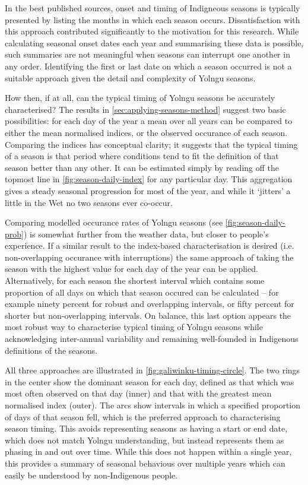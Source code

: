 In the best published sources, onset and timing of Indigneous seasons is typically presented
by listing the months in which each season occurs.  Dissatisfaction with this
approach contributed significantly to the motivation for this research.
%
While calculating seasonal onset dates each year and summarising these data
is possible, such summaries are not meaningful when seasons can interrupt
one another in any order.  Identifying the first or last date on which a
season occurred is not a suitable approach given the detail and complexity of Yolngu seasons.

How then, if at all, can the typical timing of Yolngu seasons be accurately
characterised?  The results in \cref{sec:applying-seasons-method} suggest two
basic possibilities: for each day of the year a mean over all years can be
compared to either the mean normalised indices, or the observed occurance
of each season.
%
Comparing the indices has conceptual clarity; it suggests that the
typical timing of a season is that period where conditions tend to fit the
definition of that season better than any other.  It can be estimated simply
by reading off the topmost line in \cref{fig:season-daily-index} for any
particular day.  This aggregation gives a steady seasonal progression for most of the
year, and while it `jitters' a little in the Wet no two seasons ever co-occur.

Comparing modelled occurance rates of Yolngu seasons (see \cref{fig:season-daily-prob}) is somewhat
further from the weather data, but closer to people's experience.  If a similar
result to the index-based characterisation is desired (i.e. non-overlapping occurance
with interruptions) the same approach of taking the season
with the highest value for each day of the year can be applied.
%
Alternatively, for each season the shortest interval which contains some
proportion of all days on which that season occured can be calculated --
for example ninety percent for robust and overlapping intervals, or fifty percent for
shorter but non-overlapping intervals.  On balance, this last option
appears the most robust way to characterise typical timing of Yolngu seasons while
acknowledging inter-annual variability and remaining well-founded in
Indigenous definitions of the seasons.

All three approaches are illustrated in \cref{fig:galiwinku-timing-circle}.
The two rings in the center show the dominant season for each day, defined as
that which was most often observed on that day (inner) and that with the
greatest mean normalised index (outer).  The arcs show intervals in which a
specified proportion of days of that season fell, which is the preferred
approach to characterising season timing.
%
This avoids representing seasons as having a start or end date, which does
not match Yolngu understanding, but instead represents them as phasing in
and out over time.  While this does not happen within a single year, this
provides a summary of seasonal behavious over multiple years which can easily
be understood by non-Indigenous people.


